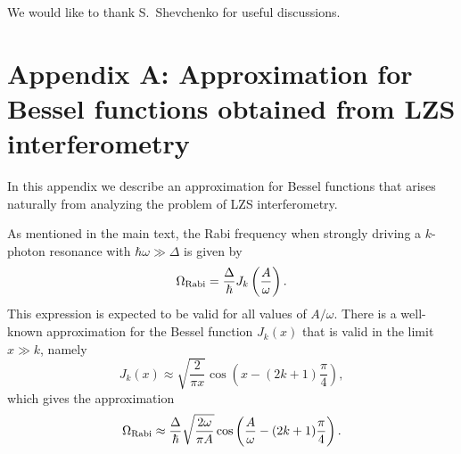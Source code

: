 \documentclass[aps,twocolumn,superscriptaddress]{revtex4}
\begin{document}
We would like to thank S.~Shevchenko for useful discussions.



\section*{Appendix A: Approximation for Bessel functions obtained from LZS interferometry}

In this appendix we describe an approximation for Bessel functions that arises naturally from analyzing the problem of LZS interferometry.

As mentioned in the main text, the Rabi frequency when strongly driving a $k$-photon resonance with $\hbar\omega\gg\Delta$ is given by
%
\begin{equation}
\Omega_{\rm Rabi} = \frac{\Delta}{\hbar} J_k\left(\frac{A}{\omega}\right).
%
\label{Eq:RabiFrequencyAsBesselFunction}
\end{equation}
%
This expression is expected to be valid for all values of $A/\omega$. There is a well-known approximation for the Bessel function $J_k(x)$ that is valid in the limit $x\gg k$, namely
%
\begin{equation}
J_k(x) \approx \sqrt{\frac{2}{\pi x}} \cos \left( x - (2k+1) \frac{\pi}{4}\right),
\end{equation}
%
which gives the approximation
%
\begin{equation}
\Omega_{\rm Rabi} \approx \frac{\Delta}{\hbar} \sqrt{\frac{2\omega}{\pi A}} \cos \left( \frac{A}{\omega} - (2k+1) \frac{\pi}{4}\right).
%
\label{Eq:RabiFrequencyWithBesselFunctionApproximation}
\end{equation}
\end{document}

